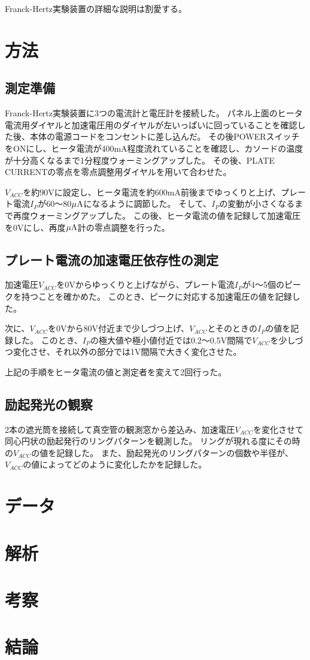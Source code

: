 \documentclass[uplatex,11pt]{jsarticle}
\begin{document}
Franck-Hertz実験装置の詳細な説明は割愛する。

\section{方法}

\subsection{測定準備}

Franck-Hertz実験装置に3つの電流計と電圧計を接続した。
パネル上面のヒータ電流用ダイヤルと加速電圧用のダイヤルが左いっぱいに回っていることを確認した後、本体の電源コードをコンセントに差し込んだ。
その後POWERスイッチをONにし、ヒータ電流が400mA程度流れていることを確認し、カソードの温度が十分高くなるまで1分程度ウォーミングアップした。
その後、PLATE CURRENTの零点を零点調整用ダイヤルを用いて合わせた。

$V_{ACC}$を約90Vに設定し、ヒータ電流を約600mA前後までゆっくりと上げ、プレート電流$I_P$が60〜80$\mu {\rm A}$になるように調節した。
そして、$I_P$の変動が小さくなるまで再度ウォーミングアップした。
この後、ヒータ電流の値を記録して加速電圧を0Vにし、再度$\mu {\rm A}$計の零点調整を行った。

\subsection{プレート電流の加速電圧依存性の測定}

加速電圧$V_{ACC}$を0Vからゆっくりと上げながら、プレート電流$I_P$が4〜5個のピークを持つことを確かめた。
このとき、ピークに対応する加速電圧の値を記録した。

次に、$V_{ACC}$を0Vから80V付近まで少しづつ上げ、$V_{ACC}$とそのときの$I_P$の値を記録した。
このとき、$I_P$の極大値や極小値付近では0.2〜0.5V間隔で$V_{ACC}$を少しづつ変化させ、それ以外の部分では1V間隔で大きく変化させた。

上記の手順をヒータ電流の値と測定者を変えて2回行った。

\subsection{励起発光の観察}

2本の遮光筒を接続して真空管の観測窓から差込み、加速電圧$V_{ACC}$を変化させて同心円状の励起発行のリングパターンを観測した。
リングが現れる度にその時の$V_{ACC}$の値を記録した。
また、励起発光のリングパターンの個数や半径が、$V_{ACC}$の値によってどのように変化したかを記録した。

\section{データ}
\section{解析}
\section{考察}
\section{結論}
\end{document}
